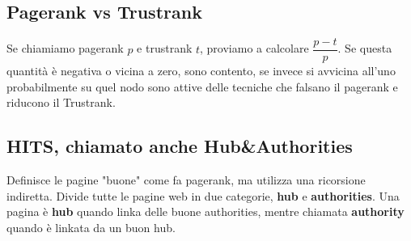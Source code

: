\subsection{Pagerank vs Trustrank}
Se chiamiamo pagerank $p$ e trustrank $t$, proviamo a calcolare $\dfrac{p-t}{p}$. Se questa quantità è negativa o vicina a zero, sono contento, se invece si avvicina all'uno probabilmente su quel nodo sono attive delle tecniche che falsano il pagerank e riducono il Trustrank.

\subsection{HITS, chiamato anche Hub\&Authorities}
Definisce le pagine "buone" come fa pagerank, ma utilizza una ricorsione indiretta. Divide tutte le pagine web in due categorie, \textbf{hub} e \textbf{authorities}. Una pagina è \textbf{hub} quando linka delle buone authorities, mentre chiamata \textbf{authority} quando è linkata da un buon hub.

